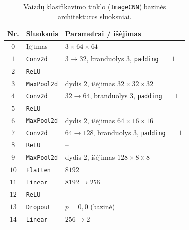 \begin{table}[H]
    \centering
    \caption{Vaizdų klasifikavimo tinklo (\texttt{ImageCNN}) bazinės architektūros sluoksniai.}
    \begin{tabular}{|c|l|l|}
        \hline
        Nr. & Sluoksnis & Parametrai / išėjimas \\
        \hline
        $0$ & Įėjimas & $3 \times 64 \times 64$ \\ \hline
        $1$ & \texttt{Conv2d} & $3 \to 32$, branduolys $3$, \texttt{padding}~$=1$ \\ \hline
        $2$ & \texttt{ReLU} & – \\ \hline
        $3$ & \texttt{MaxPool2d} & dydis $2$, išėjimas $32 \times 32 \times 32$ \\ \hline
        $4$ & \texttt{Conv2d} & $32 \to 64$, branduolys $3$, \texttt{padding}~$=1$ \\ \hline
        $5$ & \texttt{ReLU} & – \\ \hline
        $6$ & \texttt{MaxPool2d} & dydis $2$, išėjimas $64 \times 16 \times 16$ \\ \hline
        $7$ & \texttt{Conv2d} & $64 \to 128$, branduolys $3$, \texttt{padding}~$=1$ \\ \hline
        $8$ & \texttt{ReLU} & – \\ \hline
        $9$ & \texttt{MaxPool2d} & dydis $2$, išėjimas $128 \times 8 \times 8$ \\ \hline
        $10$ & \texttt{Flatten} & $8192$ \\ \hline
        $11$ & \texttt{Linear} & $8192 \to 256$ \\ \hline
        $12$ & \texttt{ReLU} & – \\ \hline
        $13$ & \texttt{Dropout} & $p = 0{,}0$ (bazinė) \\ \hline
        $14$ & \texttt{Linear} & $256 \to 2$ \\ \hline
    \end{tabular}
    \label{tab:image_cnn_architecture}
\end{table}
